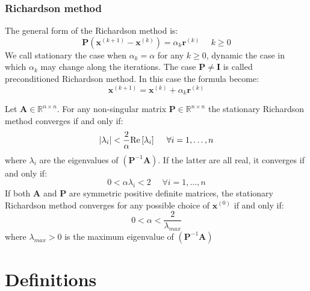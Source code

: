 \documentclass[12pt, a4paper]{report}
\newtheorem[style=M,bodystyle=\normalfont]{theorem}{Theorem}
\newtheorem[style=M,bodystyle=\normalfont]{proposition}{Proposition}
\newtheorem[style=M,bodystyle=\normalfont]{corollary}{Corollary}
\newtheorem[style=M,bodystyle=\normalfont]{lemma}{Lemma}
\newtheorem[style=M,bodystyle=\normalfont]{definition}{Definition}
\begin{document}
    \subsection{Richardson method}
    The general form of the Richardson method is: 
    \[\boldsymbol{P}(\boldsymbol{x}^{(k+1)}-\boldsymbol{x}^{(k)})=\alpha_k\boldsymbol{r}^{(k)} \:\:\:\:\:\: k \geq 0\]
    We call stationary the case when $\alpha_k=\alpha$ for any $k \geq 0$, dynamic the case in which $\alpha_k$ may change along the iterations. The case 
    $\boldsymbol{P} \neq \boldsymbol{I}$ is called preconditioned Richardson method. In this case the formula become: 
    \[\boldsymbol{x}^{(k+1)}=\boldsymbol{x}^{(k)}+\alpha_k \boldsymbol{r}^{(k)}\]
    \begin{proposition}
        Let $\boldsymbol{A} \in \mathbb{R}^{n \times n}$. For any non-singular matrix $\boldsymbol{P} \in \mathbb{R}^{n \times n}$ the stationary Richardson method converges
        if and only if: 
        \[\left\lvert \lambda_i\right\rvert < \dfrac{2}{\alpha} \textnormal{Re}\left[\lambda_i\right] \:\:\:\:\:\:\forall i=1,\dots,n\]
        where $\lambda_i$ are the eigenvalues of $(\boldsymbol{P}^{-1}\boldsymbol{A})$. If the latter are all real, it converges if and only if: 
        \[0 < \alpha\lambda_i<2 \:\:\:\:\:\:\forall i=1,\dots,n\]
        If both $\boldsymbol{A}$ and $\boldsymbol{P}$ are symmetric positive definite matrices, the stationary Richardson method converges for any possible choice of 
        $\boldsymbol{x}^{(0)}$ if and only if: 
        \[0 < \alpha < \dfrac{2}{\lambda_{max}}\]
        where $\lambda_{max} >0$ is the maximum eigenvalue of $(\boldsymbol{P}^{-1} \boldsymbol{A})$
    \end{proposition}












\newpage

\chapter{Definitions}
\end{document}
